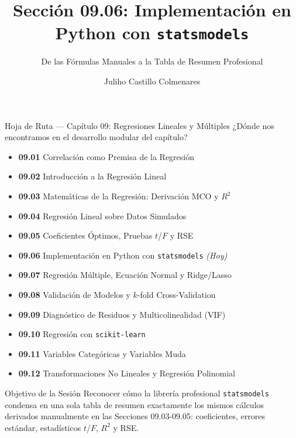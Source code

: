 \documentclass[10pt, aspectratio=169]{beamer}
\title[Implementación con Python]{Sección 09.06: Implementación en Python con \texttt{statsmodels}}
\subtitle{De las Fórmulas Manuales a la Tabla de Resumen Profesional}
\author[J. Castillo Colmenares]{Juliho Castillo Colmenares}
\institute{Tecnológico de Monterrey}
\date{\vspace{-1.2cm}}
\begin{document}
\begin{frame}[plain]
  \vspace{-0.8cm}
  \titlepage
\end{frame}

\begin{frame}{Hoja de Ruta --- Capítulo 09: Regresiones Lineales y Múltiples}
  \scriptsize
  ¿Dónde nos encontramos en el desarrollo modular del capítulo?
  \begin{itemize}\itemsep=0.02em
    \item \textbf{09.01} Correlación como Premisa de la Regresión
    \item \textbf{09.02} Introducción a la Regresión Lineal
    \item \textbf{09.03} Matemáticas de la Regresión: Derivación MCO y $R^2$
    \item \textbf{09.04} Regresión Lineal sobre Datos Simulados
    \item \textbf{09.05} Coeficientes Óptimos, Pruebas $t$/$F$ y RSE
    \item \textbf{09.06} Implementación en Python con \texttt{statsmodels} \emph{(Hoy)}
    \item \textbf{09.07} Regresión Múltiple, Ecuación Normal y Ridge/Lasso
    \item \textbf{09.08} Validación de Modelos y $k$-fold Cross-Validation
    \item \textbf{09.09} Diagnóstico de Residuos y Multicolinealidad (VIF)
    \item \textbf{09.10} Regresión con \texttt{scikit-learn}
    \item \textbf{09.11} Variables Categóricas y Variables Muda
    \item \textbf{09.12} Transformaciones No Lineales y Regresión Polinomial
  \end{itemize}
  \pause
  \vspace{-0.05cm}
  \begin{block}{Objetivo de la Sesión}
    Reconocer cómo la librería profesional \texttt{statsmodels} condensa en una sola tabla de resumen exactamente los mismos cálculos derivados manualmente en las Secciones 09.03-09.05: coeficientes, errores estándar, estadísticos $t$/$F$, $R^2$ y RSE.
  \end{block}
\end{frame}
\end{document}
